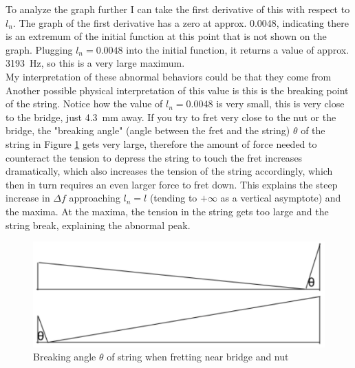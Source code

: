 \documentclass[11pt]{article}
\begin{document}
\begin{flushleft}
                To analyze the graph further I can take the first derivative of this with respect to $l_n$. The graph of the first derivative has a zero at approx. 0.0048, indicating there is an extremum of the initial function at this point that is not shown on the graph. Plugging $l_n = 0.0048$ into the initial function, it returns a value of approx. \SI{3193}{Hz}, so this is a very large maximum.\\
                My interpretation of these abnormal behaviors could be that they come from 
                Another possible physical interpretation of this value is this is the breaking point of the string. Notice how the value of $l_n = 0.0048$ is very small, this is very close to the bridge, just \SI{4.3}{mm} away. If you try to fret very close to the nut or the bridge, the "breaking angle" (angle between the fret and the string) $\theta$ of the string in Figure \ref{fig9} gets very large, therefore the amount of force needed to counteract the tension to depress the string to touch the fret increases dramatically, which also increases the tension of the string accordingly, which then in turn requires an even larger force to fret down. This explains the steep increase in $\Delta f$ approaching $l_n = l$ (tending to $+\infty$ as a vertical asymptote) and the maxima. At the maxima, the tension in the string gets too large and the string break, explaining the abnormal peak. 
                \begin{figure}
                    \includegraphics[width=\textwidth]{breaking_angles.png}
                    \caption{Breaking angle $\theta$ of string when fretting near bridge and nut} \label{fig9}
                \end{figure}
            
    \end{flushleft}
\end{document}

